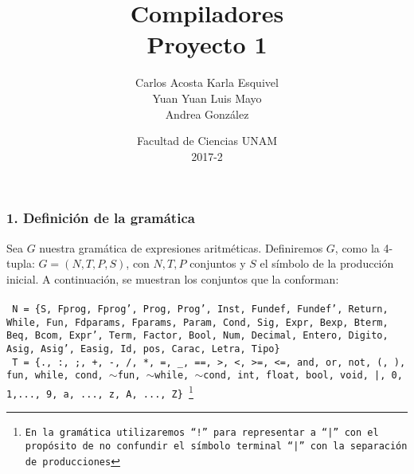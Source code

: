 \documentclass[12pt]{article}
\title{Compiladores\\ Proyecto 1}
\author{Carlos Acosta \qquad Karla Esquivel \\ Yuan Yuan \qquad Luis Mayo \\ Andrea González}
\date{Facultad de Ciencias UNAM \\ 2017-2}
\begin{document}
\maketitle
\subsubsection*{1. Definición de la gramática}

Sea $G$ nuestra gramática de expresiones aritméticas. Definiremos $G$, como la 4-tupla: $G = (N,T,P,S)$, con $N,T,P$ conjuntos y $S$ el símbolo de la producción inicial.
A continuación, se muestran los conjuntos que la conforman:\\ \\
\texttt{ 
N = \{S, Fprog, Fprog', Prog, Prog', Inst, Fundef, Fundef', Return, While, Fun, Fdparams, Fparams, Param, Cond, Sig, Expr, Bexp, Bterm, Beq, Bcom, Expr', Term, Factor, Bool, Num, Decimal, Entero, Digito, Asig, Asig', Easig, Id, pos, Carac, Letra, Tipo\}
}\\

\texttt{
T = \{., :, ;, +, -, /, *, =, \_, ==, >, <, >=, <=, and, or, not, (, ), fun, while, cond, $\sim$fun, $\sim$while, $\sim$cond, int, float, bool, void, |, 0, 1,..., 9, a, ..., z, A, ..., Z\}  \footnote{En la gramática utilizaremos ``!'' para representar a ``|'' con el propósito de no confundir el símbolo terminal ``|'' con la separación de producciones}
}\\
\end{document}

